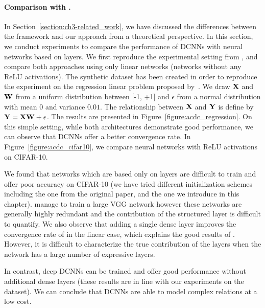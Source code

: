 \paragraph{Comparison with \ACDC \citep{moczulski2015acdc}.}


In Section~\ref{section:ch3-related_work}, we have discussed the differences between the \ACDC framework and our approach from a theoretical perspective.
In this section, we conduct experiments to compare the performance of DCNNs with neural networks based on \ACDC layers. 
We first reproduce the experimental setting from \citet{moczulski2015acdc}, and compare both approaches using only linear networks (\ie networks without any ReLU activations).
The synthetic dataset has been created in order to reproduce the experiment on the regression linear problem proposed by~\citet{moczulski2015acdc}.
We draw $\mathbf{X}$ and $\mathbf{W}$ from a uniform distribution between [-1, +1] and $\epsilon$ from a normal distribution with mean 0 and variance $0.01$.
The relationship between $\mathbf{X}$ and $\mathbf{Y}$ is define by $\mathbf{Y} = \mathbf{X}\mathbf{W} + \epsilon$. 
The results are presented in Figure~\ref{figure:acdc_regression}.
On this simple setting, while both architectures demonstrate good performance, we can observe that DCNNs offer a better convergence rate.
In Figure~\ref{figure:acdc_cifar10}, we compare neural networks with ReLU activations on CIFAR-10. 

We found that networks which are based only on \ACDC layers are difficult to train and offer poor accuracy on CIFAR-10 (we have tried different initialization schemes including the one from the original paper, and the one we introduce in this chapter).
\citet{moczulski2015acdc} manage to train a large VGG network  however these networks are generally highly redundant and the contribution of the structured layer is difficult to quantify. 
We also observe that adding a single dense layer improves the convergence rate of \ACDC in the linear case, which explains the good results of \citet{moczulski2015acdc}.
However, it is difficult to characterize the true contribution of the \ACDC layers when the network has a large number of expressive layers.

In contrast, deep DCNNs can be trained and offer good performance without additional dense layers (these results are in line with our experiments on the \yt dataset).
We can conclude that DCNNs are able to model complex relations at a low cost. 

